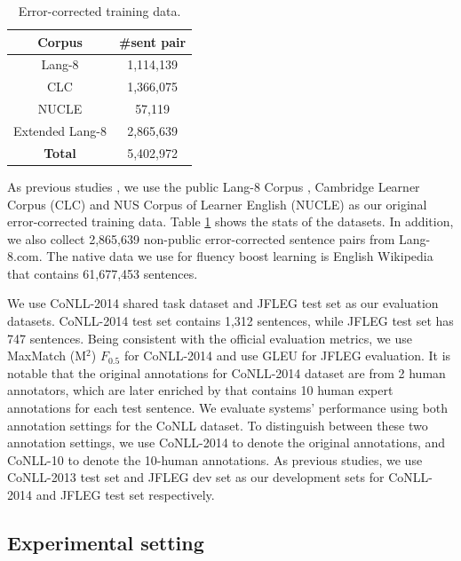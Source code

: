\documentclass{article} %
\begin{document}
\begin{table}[h]
\centering
\begin{tabular}{c|c}
\hline
\textbf{Corpus} & \textbf{\#sent pair} \\ 
\hline
Lang-8          &            1,114,139         \\
CLC             &           1,366,075           \\
NUCLE           &    57,119        \\
Extended Lang-8 &    2,865,639 \\
\hline
\bf Total	&  5,402,972 \\
\hline
\end{tabular}
\caption{Error-corrected training data.}
\label{tab:data_stats}
\end{table}


As previous studies \citep{ji2017nested}, we use the public Lang-8 Corpus \citep{mizumoto2011mining,tajiri2012tense}, Cambridge Learner Corpus (CLC) \citep{nicholls2003cambridge} and NUS Corpus of Learner English (NUCLE) \citep{dahlmeier2013building} as our original error-corrected training data. Table \ref{tab:data_stats} shows the stats of the datasets. In addition, we also collect 2,865,639 non-public error-corrected sentence pairs from Lang-8.com. The native data we use for fluency boost learning is English Wikipedia that contains 61,677,453 sentences.

We use CoNLL-2014 shared task dataset \citep{ng2014conll} and JFLEG \citep{napoles2017jfleg} test set as our evaluation datasets. CoNLL-2014 test set contains 1,312 sentences, while JFLEG test set has 747 sentences. Being consistent with the official evaluation metrics, we use MaxMatch (M$^2$) $F_{0.5}$ \citep{dahlmeier-ng:2012:NAACL-HLT} for CoNLL-2014 and use GLEU \citep{napoles2015ground} for JFLEG evaluation. It is notable that the original annotations for CoNLL-2014 dataset are from 2 human annotators, which are later enriched by \cite{bryant2015far} that contains 10 human expert annotations for each test sentence. We evaluate systems' performance using both annotation settings for the CoNLL dataset. To distinguish between these two annotation settings, we use CoNLL-2014 to denote the original annotations, and CoNLL-10 to denote the 10-human annotations.
As previous studies, we use CoNLL-2013 test set and JFLEG dev set as our development sets for CoNLL-2014 and JFLEG test set respectively.%

\subsection{Experimental setting}\label{subsec:setting}
\end{document}

